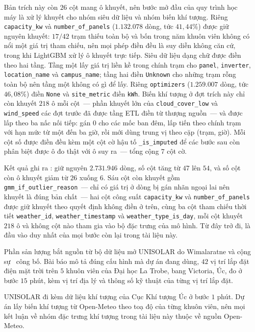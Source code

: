 \documentclass[12pt, a4paper]{report}
\begin{document}
Bản trích này còn $26$ cột mang ô khuyết, nên bước mở đầu của quy trình học máy là xử lý
khuyết cho nhóm siêu dữ liệu và nhóm biến khí tượng. Riêng \texttt{capacity\_kw} và
\texttt{number\_of\_panels} ($1.132.078$ dòng, tức $41{,}44\%$) được giữ nguyên khuyết:
$17/42$ trạm thiếu toàn bộ và bốn trong năm khuôn viên không có nổi một giá trị tham chiếu,
nên mọi phép điền đều là suy diễn không căn cứ, trong khi LightGBM xử lý ô khuyết trực tiếp.
Siêu dữ liệu dạng chữ được điền theo hai tầng. Tầng một lấy giá trị liền kề trong chính
trạm cho \texttt{panel}, \texttt{inverter}, \texttt{location\_name} và
\texttt{campus\_name}; tầng hai điền \texttt{Unknown} cho những trạm rỗng toàn bộ nên
tầng một không có gì để lấy. Riêng \texttt{optimizers} ($1.259.007$ dòng, tức
$46{,}08\%$) điền \texttt{None} và \texttt{site\_metric} điền \texttt{kWh}. Biến khí tượng ở đợt trích
này chỉ còn khuyết $218$ ô mỗi cột~--- phần khuyết lớn của \texttt{cloud\_cover\_low} và
\texttt{wind\_speed} các đợt trước đã được tầng ETL điền từ thượng nguồn~--- và được lấp
theo ba nấc nối tiếp: gán $0$ cho các mốc ban đêm, lấp tiến theo chính trạm với hạn mức
từ một đến ba giờ, rồi mới dùng trung vị theo cặp (trạm, giờ). Mỗi cột số
được điền đều kèm một cột cờ hậu tố \texttt{\_is\_imputed} để các bước sau còn phân biệt
được ô đo thật với ô suy ra~--- tổng cộng $7$ cột cờ.

Kết quả ghi ra : giữ nguyên
$2.731.946$ dòng, số cột tăng từ $47$ lên $54$, và số cột còn ô khuyết giảm từ $26$ xuống
$6$. Sáu cột còn khuyết gồm \texttt{gmm\_if\_outlier\_reason}~--- chỉ có giá trị ở dòng bị
gán nhãn ngoại lai nên khuyết là đúng bản chất~--- hai cột công suất
\texttt{capacity\_kw} và \texttt{number\_of\_panels} được giữ khuyết theo quyết định không
điền ở trên, cùng ba cột tham chiếu thời tiết
\texttt{weather\_id}, \texttt{weather\_timestamp} và \texttt{weather\_type\_is\_day}, mỗi
cột khuyết $218$ ô và không cột nào tham gia vào bộ đặc trưng của mô hình. Từ đây trở đi,
 là đầu vào duy nhất của mọi bước còn lại trong tài liệu này.

Phần sản lượng bắt nguồn từ bộ dữ liệu mở UNISOLAR do Wimalaratne và cộng
sự~\cite{wimalaratne2022unisolar} công bố. Bài báo mô tả đúng cấu hình mà dự án đang
dùng, $42$ vị trí lắp đặt điện mặt trời trên $5$ khuôn viên của Đại học La Trobe, bang Victoria,
Úc, đo ở bước $15$ phút, kèm vị trí địa lý và thông số kỹ thuật của từng vị trí lắp đặt.

UNISOLAR đi kèm dữ liệu khí tượng của Cục Khí tượng Úc ở bước $1$ phút. Dự án lấy biến
khí tượng từ Open-Meteo theo toạ độ của từng khuôn viên, nên mọi kết luận về
nhóm đặc trưng khí tượng trong tài liệu này thuộc về nguồn Open-Meteo.
\end{document}
